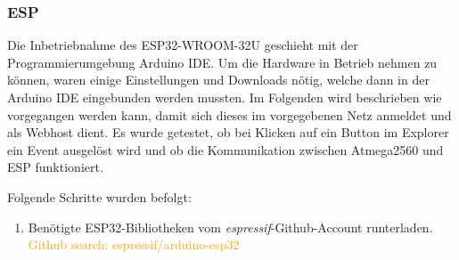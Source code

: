 \subsubsection{ESP}
\label{subsubsec:Inbetriebnahme_ESP}

Die Inbetriebnahme des ESP32-WROOM-32U geschieht mit der Programmierumgebung Arduino IDE. Um die Hardware in Betrieb nehmen zu können, waren einige Einstellungen und Downloads nötig, welche dann in der Arduino IDE eingebunden werden mussten. Im Folgenden wird beschrieben wie vorgegangen werden kann, damit sich dieses im vorgegebenen Netz anmeldet und als Webhost dient. Es wurde getestet, ob bei Klicken auf ein Button im Explorer ein Event ausgelöst wird und ob die Kommunikation zwischen Atmega2560 und ESP funktioniert.

Folgende Schritte wurden befolgt:
\begin{enumerate}
\item Benötigte ESP32-Bibliotheken vom \textit{espressif}-Github-Account runterladen.\cite{grokhotkov_espressifarduino-esp32_2020} \newline
\textcolor{orange}{Github search: espressif/arduino-esp32} \cite{grokhotkov_espressifarduino-esp32_2020}
\newline


\end{enumerate}
